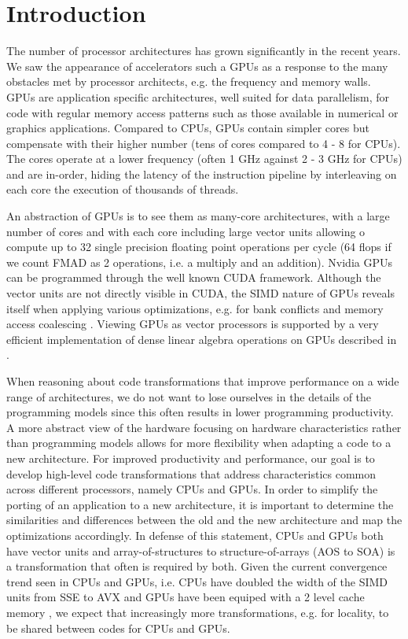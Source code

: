 \section{Introduction}
The number of processor architectures has grown significantly in the recent
years. We saw the appearance of accelerators such a GPUs as a response to the
many obstacles met by processor architects, e.g. the frequency and memory walls.
GPUs are application specific architectures, well suited for data parallelism,
for code with regular memory access patterns such as those available in
numerical or graphics applications. Compared to CPUs, GPUs contain simpler cores
but compensate with their higher number (tens of cores compared to 4 - 8 for
CPUs). The cores operate at a lower frequency (often 1 GHz against 2 - 3 GHz for
CPUs) and are in-order, hiding the latency of the instruction pipeline by
interleaving on each core the execution of thousands of threads.

An abstraction of GPUs is to see them as many-core architectures, with a large
number of cores and with each core including large vector units allowing  o
compute up to 32 single precision floating point operations per cycle (64 flops
if we count FMAD as 2 operations, i.e. a multiply and an addition). Nvidia GPUs
can be programmed through the well known CUDA framework. Although the vector
units are not directly visible in CUDA, the SIMD nature of GPUs reveals itself
when applying various optimizations, e.g. for bank conflicts and memory access
coalescing \cite{cuda}. Viewing GPUs as vector processors is supported by a very
efficient implementation of dense linear algebra operations on GPUs described in
\cite{Volkov:2008:BGT:1413370.1413402}.

When reasoning about code transformations that improve performance on a wide
range of architectures, we do not want to lose ourselves in the details of the
programming models since this often results in lower programming productivity.
A more abstract view of the hardware focusing on hardware characteristics rather
than programming models allows for more flexibility when adapting a code to a
new architecture. For improved productivity and performance, our goal is to
develop high-level code transformations that address characteristics common
across different processors, namely CPUs and GPUs. In order to simplify the
porting of an application to a new architecture, it is important to determine
the similarities and differences between the old and the new architecture and
map the optimizations accordingly. In defense of this statement, CPUs and GPUs
both have vector units and array-of-structures to structure-of-arrays (AOS to
SOA) is a transformation that often is required by both. Given the current
convergence trend seen in CPUs and GPUs, i.e. CPUs have doubled the width of the
SIMD units from SSE to AVX and GPUs have been equiped with a 2 level cache
memory \cite{fermi}, we expect that increasingly more transformations, e.g. for
locality, to be shared between codes for CPUs and GPUs.

